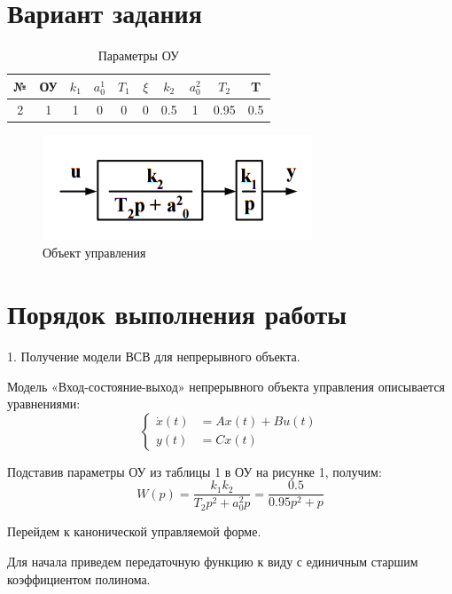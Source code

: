 \documentclass[a4paper,14pt]{extreport}
\begin{document}
	\section{Вариант задания}
	
	\begin{table}[H]
		\centering
		\caption{Параметры ОУ}
		\label{my-label}
		\begin{tabular}{|c|c|c|c|c|c|c|c|c|c|}
			\hline
			№ & ОУ & $k_1$ & $a_0^1$ & $T_1$ & $\xi$ & $k_2$ & $a_0^2$ & $T_2$ & T   \\ \hline
			2 & 1  & 1     & 0       & 0     & 0     & 0.5   & 1       & 0.95  & 0.5 \\ \hline
		\end{tabular}
	\end{table}
	
	\begin{figure}[H]
		\center\includegraphics[width=0.5\linewidth]{oc.png}
		\caption{Объект управления}
		\label{fig:scr1}
	\end{figure}
	
	\section{Порядок выполнения работы}
	
	1. Получение модели ВСВ для непрерывного объекта.
	
	Модель «Вход-состояние-выход» непрерывного объекта управления описывается уравнениями:
	\begin{equation}
	\begin{cases}
	\dot x(t) &= A x(t) + B u(t)\\
	y(t) &= C x(t)
	\end{cases}
	\end{equation}
	
	Подставив параметры ОУ из таблицы 1 в ОУ на рисунке 1, получим:
	\begin{equation}
	W(p) = \frac{k_1 k_2}{T_2 p^2 + a_0^2 p} = \frac{0.5}{0.95 p^2 + p} 
	\end{equation}
	
	Перейдем к канонической управляемой форме.
	
	Для начала приведем передаточную функцию к виду с единичным старшим коэффициентом полинома.
	
\end{document}
